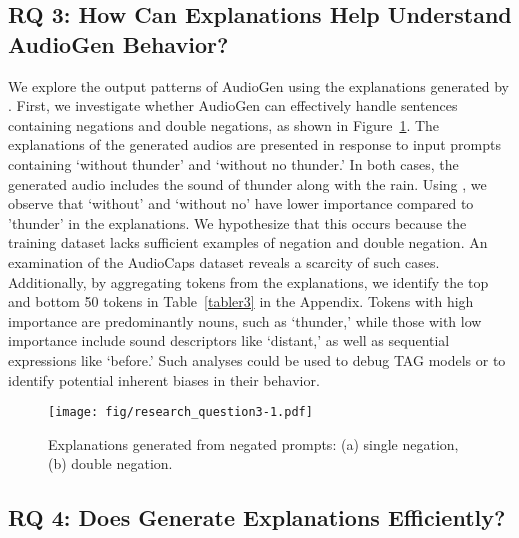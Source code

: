 \subsection{RQ 3: How Can Explanations Help Understand AudioGen Behavior?} 

We explore the output patterns of AudioGen using the explanations generated by \mname{}. First, we investigate whether AudioGen can effectively handle sentences containing negations and double negations, as shown in Figure~\ref{rq3}. The explanations of the generated audios are presented in response to input prompts containing `without thunder' and `without no thunder.' In both cases, the generated audio includes the sound of thunder along with the rain. Using \mname{}, we observe that `without' and `without no' have lower importance compared to 'thunder' in the explanations. We hypothesize that this occurs because the training dataset lacks sufficient examples of negation and double negation. An examination of the AudioCaps dataset reveals a scarcity of such cases. Additionally, by aggregating tokens from the explanations, we identify the top and bottom 50 tokens in Table~\ref{tabler3} in the Appendix. Tokens with high importance are predominantly nouns, such as `thunder,' while those with low importance include sound descriptors like `distant,' as well as sequential expressions like `before.' Such analyses could be used to debug TAG models or to identify potential inherent biases in their behavior. 

\begin{figure}
    \center
    \texttt{[image: fig/research\_question3-1.pdf]}
    \caption{Explanations generated from negated prompts: (a) single negation, (b) double negation.}
    \label{rq3}
\end{figure}

\subsection{RQ 4: Does \mname{} Generate Explanations Efficiently?}

